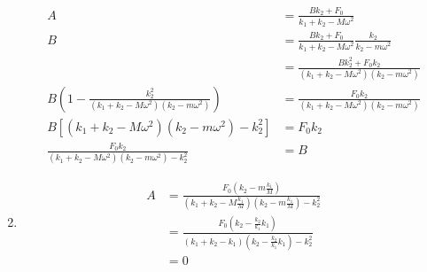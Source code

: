 \documentclass{article}
\begin{document}
\begin{enumerate}
        \begin{align*}
          A                                                                              & = \frac{B k_2 + F_0}{k_1 + k_2 - M \omega^2}                              \\
          B                                                                              & = \frac{B k_2 + F_0}{k_1 + k_2 - M \omega^2} \frac{k_2}{k_2 - m \omega^2} \\
                                                                                         & = \frac{B k_2^2 + F_0 k_2}{(k_1 + k_2 - M \omega^2) (k_2 - m \omega^2)}   \\
          B \left( 1 - \frac{k_2^2}{(k_1 + k_2 - M \omega^2) (k_2 - m \omega^2)} \right) & = \frac{F_0 k_2}{(k_1 + k_2 - M \omega^2) (k_2 - m \omega^2)}             \\
          B [(k_1 + k_2 - M \omega^2) (k_2 - m \omega^2) - k_2^2]                        & = F_0 k_2                                                                 \\
          \frac{F_0 k_2}{(k_1 + k_2 - M \omega^2) (k_2 - m \omega^2) - k_2^2}            & = B
        \end{align*}

  \item

        \begin{align*}
          A & = \frac{F_0 \left( k_2 - m \frac{k_1}{M} \right)}{\left( k_1 + k_2 - M \frac{k_1}{M} \right) \left( k_2 - m \frac{k_1}{M} \right) - k_2^2} \\
            & = \frac{F_0 \left( k_2 - \frac{k_2}{k_1} k_1 \right)}{\left( k_1 + k_2 - k_1 \right) \left( k_2 - \frac{k_2}{k_1} k_1 \right) - k_2^2}     \\
            & = 0
        \end{align*}
\end{enumerate}

\subsection{}
\end{document}
